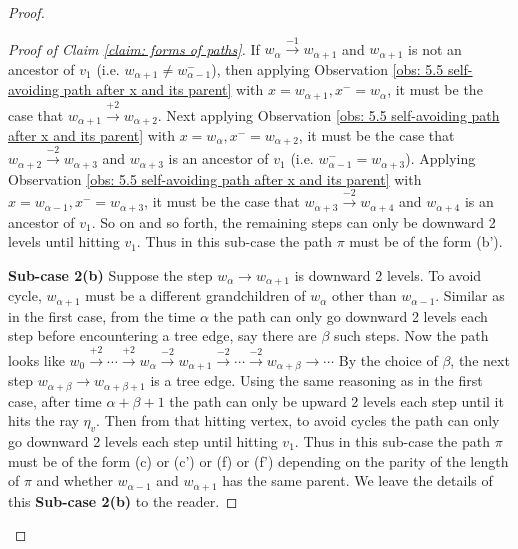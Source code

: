 \documentclass[12pt]{article}
\numberwithin{equation}{section}
\newcommand{\1}{\mathbf{1}}
\begin{document}
\begin{proof}
\begin{proof}[Proof of Claim \ref{claim: forms of paths}]
 	 
 	 	If $w_{\alpha}\stackrel{-1}{\rightarrow}w_{\alpha+1}$ and $w_{\alpha+1}$ is not an ancestor of $v_1$ (i.e. $w_{\alpha+1}\neq w_{\alpha-1}^-$),
 	 then applying Observation \ref{obs: 5.5 self-avoiding path after x and its parent} with $x=w_{\alpha+1},x^-=w_{\alpha}$, it must be the case that  $w_{\alpha+1}\stackrel{+2}{\rightarrow} w_{\alpha+2}$. Next applying Observation \ref{obs: 5.5 self-avoiding path after x and its parent} with $x=w_\alpha,x^-=w_{\alpha+2}$, it must be the case that  $w_{\alpha+2}\stackrel{-2}{\rightarrow} w_{\alpha+3}$ and $w_{\alpha+3}$ is an ancestor of $v_1$ (i.e. $w_{\alpha-1}^-=w_{\alpha+3}$). Applying Observation \ref{obs: 5.5 self-avoiding path after x and its parent} with $x=w_{\alpha-1},x^-=w_{\alpha+3}$, it must be the case that  $w_{\alpha+3}\stackrel{-2}{\rightarrow} w_{\alpha+4}$ and $w_{\alpha+4}$ is an ancestor of $v_1$.  So on and so forth, the remaining steps can only be downward 2 levels until hitting $v_1$. Thus in this sub-case the path $\pi$  must be of the form  (b'). 
 	 
 	 
 	 
 	 
 	\textbf{Sub-case 2(b)}
 	Suppose the step $w_\alpha\rightarrow w_{\alpha+1}$ is downward 2 levels. To avoid cycle, $w_{\alpha+1}$ must be a different grandchildren of $w_\alpha$ other than $w_{\alpha-1}$. 
 	Similar as in the first case, from the time $\alpha$ the path can only go downward 2 levels each step before encountering a tree edge, say there are $\beta$ such steps.
 	Now the path looks like $w_0\stackrel{+2}{\rightarrow}\cdots \stackrel{+2}{\rightarrow}w_{\alpha}\stackrel{-2}{\rightarrow}w_{\alpha+1}\stackrel{-2}{\rightarrow}\cdots \stackrel{-2}{\rightarrow} w_{\alpha+\beta}\rightarrow\cdots$
 	By the choice of $\beta$, the next step $w_{\alpha+\beta}\rightarrow w_{\alpha+\beta+1}$ is a tree edge. Using the same reasoning as in the first case, after time $\alpha+\beta+1$ the path can only be upward 2 levels each step until it hits the ray  $\eta_v$. Then from that hitting vertex, to avoid cycles the path can only go downward 2 levels each step until hitting $v_1$. 
 	Thus in this sub-case the path $\pi$  must be of the form (c) or (c') or (f) or (f') depending on the parity of the length of $\pi$ and whether $w_{\alpha-1}$ and $w_{\alpha+1}$ has the same parent.
 	We leave the details of this \textbf{Sub-case 2(b)} to the reader.
 	
 	
 	
 	
 	
 	
 	
 	
 	

\end{proof}
\end{proof}
\end{document}
